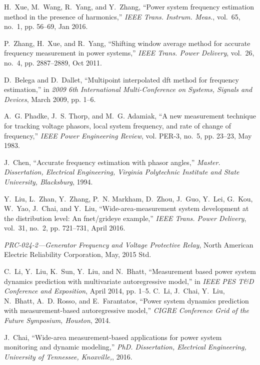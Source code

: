 \documentclass[journal,twoside]{IEEEtran}
\begin{document}
\begin{thebibliography}{10}
	H.~Xue, M.~Wang, R.~Yang, and Y.~Zhang, ``Power system frequency estimation
	method in the presence of harmonics,'' \emph{IEEE Trans. Instrum. Meas.},
	vol.~65, no.~1, pp. 56--69, Jan 2016.
	
	P.~Zhang, H.~Xue, and R.~Yang, ``Shifting window average method for accurate
	frequency measurement in power systems,'' \emph{IEEE Trans. Power Delivery},
	vol.~26, no.~4, pp. 2887--2889, Oct 2011.
	
	D.~Belega and D.~Dallet, ``Multipoint interpolated dft method for frequency
	estimation,'' in \emph{2009 6th International Multi-Conference on Systems,
		Signals and Devices}, March 2009, pp. 1--6.
	
	A.~G. Phadke, J.~S. Thorp, and M.~G. Adamiak, ``A new measurement technique for
	tracking voltage phasors, local system frequency, and rate of change of
	frequency,'' \emph{IEEE Power Engineering Review}, vol. PER-3, no.~5, pp.
	23--23, May 1983.
	
	J.~Chen, ``Accurate frequency estimation with phasor angles,'' \emph{Master.
		Dissertation, Electrical Engineering, Virginia Polytechnic Institute and State
		University, Blacksburg}, 1994.
	
	Y.~Liu, L.~Zhan, Y.~Zhang, P.~N. Markham, D.~Zhou, J.~Guo, Y.~Lei, G.~Kou,
	W.~Yao, J.~Chai, and Y.~Liu, ``Wide-area-measurement system development at
	the distribution level: An fnet/grideye example,'' \emph{IEEE Trans. Power
		Delivery}, vol.~31, no.~2, pp. 721--731, April 2016.
	
	\emph{PRC-024-2—Generator Frequency and Voltage Protective Relay}, North
	American Electric Reliability Corporation, May, 2015 Std.
	
	C.~Li, Y.~Liu, K.~Sun, Y.~Liu, and N.~Bhatt, ``Measurement based power system
	dynamics prediction with multivariate autoregressive model,'' in \emph{IEEE
		PES T\&D Conference and Exposition}, April 2014, pp. 1--5.
	C.~Li, J.~Chai, Y.~Liu, N.~Bhatt, A.~D. Rosso, and E.~Farantatos, ``Power
	system dynamics prediction with measurement-based autoregressive model,''
	\emph{CIGRE Conference Grid of the Future Symposium, Houston}, 2014.

	J.~Chai, ``Wide-area measurement-based applications for power system monitoring
	and dynamic modeling,'' \emph{PhD. Dissertation, Electrical Engineering, University of
		Tennessee, Knoxville,}, 2016.
	

\end{thebibliography}
\end{document}
